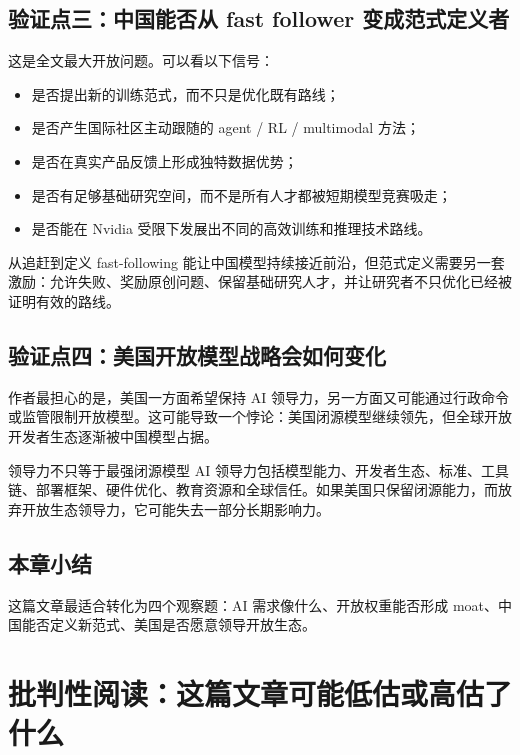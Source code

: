 \documentclass[a4paper]{article}
\begin{document}
\subsection{验证点三：中国能否从 fast follower 变成范式定义者}

这是全文最大开放问题。可以看以下信号：

\begin{itemize}[leftmargin=1.5em]
    \item 是否提出新的训练范式，而不只是优化既有路线；
    \item 是否产生国际社区主动跟随的 agent / RL / multimodal 方法；
    \item 是否在真实产品反馈上形成独特数据优势；
    \item 是否有足够基础研究空间，而不是所有人才都被短期模型竞赛吸走；
    \item 是否能在 Nvidia 受限下发展出不同的高效训练和推理技术路线。
\end{itemize}

\begin{importantbox}{从追赶到定义}
fast-following 能让中国模型持续接近前沿，但范式定义需要另一套激励：允许失败、奖励原创问题、保留基础研究人才，并让研究者不只优化已经被证明有效的路线。
\end{importantbox}

\subsection{验证点四：美国开放模型战略会如何变化}

作者最担心的是，美国一方面希望保持 AI 领导力，另一方面又可能通过行政命令或监管限制开放模型。这可能导致一个悖论：美国闭源模型继续领先，但全球开放开发者生态逐渐被中国模型占据。

\begin{warningbox}{领导力不只等于最强闭源模型}
AI 领导力包括模型能力、开发者生态、标准、工具链、部署框架、硬件优化、教育资源和全球信任。如果美国只保留闭源能力，而放弃开放生态领导力，它可能失去一部分长期影响力。
\end{warningbox}

\subsection{本章小结}

这篇文章最适合转化为四个观察题：AI 需求像什么、开放权重能否形成 moat、中国能否定义新范式、美国是否愿意领导开放生态。


\section{批判性阅读：这篇文章可能低估或高估了什么}
\end{document}
